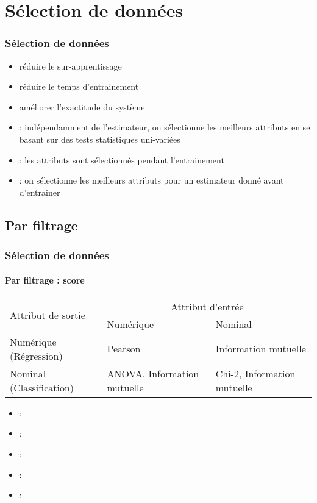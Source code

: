 \documentclass[xcolor=table]{beamer}
\begin{document}
\section{Sélection de données}

\begin{frame}
	\frametitle{Sélection de données}
	
	\begin{itemize}
		\item réduire le sur-apprentissage 
		\item réduire le temps d'entrainement
		\item améliorer l'exactitude du système
		\item {} : indépendamment de l'estimateur, on sélectionne les meilleurs attributs en se basant sur des tests statistiques uni-variées
		\item {} : les attributs sont sélectionnés pendant l'entrainement
		\item {} : on sélectionne les meilleurs attributs pour un estimateur donné avant d'entrainer
	\end{itemize}
	
\end{frame}

\subsection{Par filtrage}

\begin{frame}
	\frametitle{Sélection de données}
	\framesubtitle{Par filtrage : score}
	
	\begin{tabular}{|p{}|p{}|p{}|}
	\hline
	\multirow{2}{*}{Attribut de sortie}	& \multicolumn{2}{c|}{Attribut d'entrée} \\
	\cline{2-3}
		& Numérique & Nominal \\
	\hline
	Numérique (Régression) & Pearson & Information mutuelle \\
	\hline
	Nominal (Classification) & ANOVA, Information mutuelle & Chi-2, Information mutuelle\\
	\hline
	\end{tabular}

	\begin{itemize}
		\item {} : 
		\item {} : 
		\item {} : 
		\item {} : 
		\item {} : 
	\end{itemize}
	
\end{frame}
\end{document}
